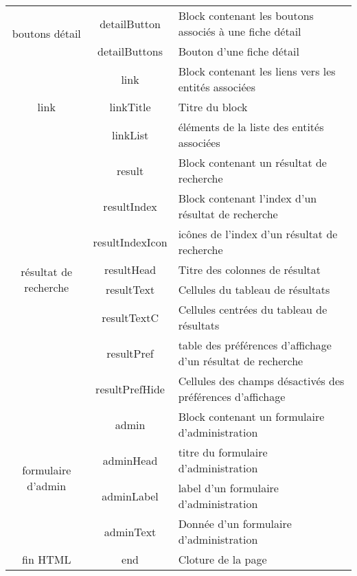 \begin{tabular}{|c|c|p{8.8cm}|}
\hline
\multirow{2}{3cm}{boutons détail} & detailButton & Block contenant les boutons associés à une fiche détail\\
\cline{2-3}
 & detailButtons & Bouton d'une fiche détail \\
\hline
\multirow{3}{3cm}{link} & link & Block contenant les liens vers les entités associées\\
\cline{2-3}
 & linkTitle & Titre du block \\
\cline{2-3}
 & linkList & éléments de la liste des entités associées \\
\hline
\multirow{8}{3cm}{résultat de recherche} & result & Block contenant un résultat de recherche\\
\cline{2-3}
 & resultIndex & Block contenant l'index d'un résultat de recherche \\
\cline{2-3}
 & resultIndexIcon & icônes de l'index d'un résultat de recherche \\
\cline{2-3}
 & resultHead & Titre des colonnes de résultat \\
\cline{2-3}
 & resultText & Cellules du tableau de résultats \\
\cline{2-3}
 & resultTextC & Cellules centrées du tableau de résultats \\
\cline{2-3}
 & resultPref & table des préférences d'affichage d'un résultat de recherche \\
\cline{2-3}
 & resultPrefHide & Cellules des champs désactivés des préférences d'affichage \\
\hline
\multirow{4}{3cm}{formulaire d'admin} & admin & Block contenant un formulaire d'administration\\
\cline{2-3}
 & adminHead & titre du formulaire d'administration \\
\cline{2-3}
 & adminLabel & label d'un formulaire d'administration \\
\cline{2-3}
 & adminText & Donnée d'un formulaire d'administration \\
\hline
fin HTML & end & Cloture de la page\\
\hline
\end{tabular}

